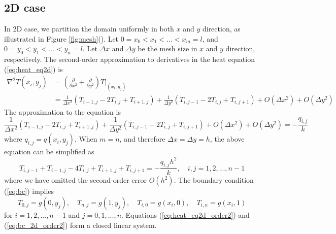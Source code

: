 \documentclass{article}
\begin{document}
\subsection{2D case}
In 2D case, we partition the domain uniformly in both $x$ and $y$ direction, as illustrated 
in Figure \ref{fig:mesh}(). Let $0 = x_0 < x_1 < ... < x_m = l$,
and $0 = y_0 < y_1 < ... < y_n = l$. Let $\Delta x$ and $\Delta y$ be the mesh size in $x$ and $y$ direction, respectively. The second-order approximation to derivatives in the heat equation (\ref{eq:heat_eq2d}) is
\begin{equation*}
\begin{split}
    \nabla^2 T(x_i, y_j) & = \left(\frac{\partial}{\partial x^2} + \frac{\partial}{\partial y^2}\right) T|_{(x_i,y_j)} \\
    & = \frac{1}{\Delta x^2}(T_{i-1,j} - 2T_{i,j} + T_{i+1,j}) + \frac{1}{\Delta y^2}(T_{i,j-1} -2T_{i,j} + T_{i,j+1})
    + O(\Delta x^2) + O(\Delta y^2)
\end{split}
\end{equation*}
The approximation to the equation is
\begin{equation*}
    \frac{1}{\Delta x^2}(T_{i-1,j} - 2T_{i,j} + T_{i+1,j}) + \frac{1}{\Delta y^2}(T_{i,j-1} -2T_{i,j} + T_{i,j+1}) + O(\Delta x^2) + O(\Delta y^2) = - \frac{q_{i,j}}{k}
\end{equation*}
where $q_{i,j} = q(x_i,y_j)$.
When $m = n$, and therefore $\Delta x = \Delta y = h$, the above equation can be simplified as
\begin{equation} \label{eq:heat_eq2d_order2}
    T_{i,j-1} + T_{i-1,j} - 4T_{i,j} + T_{i+1,j} + T_{i,j+1} = - \frac{q_{i,j} h^2}{k},
    \quad i, j = 1, 2, ..., n-1
\end{equation}
where we have omitted the second-order error $O(h^2)$. The boundary condition (\ref{eq:bc}) implies
\begin{equation} \label{eq:bc_2d_order2}
    T_{0,j} = g(0,y_j), \quad T_{n,j} = g(1,y_j), \quad T_{i,0} = g(x_i,0), \quad T_{i,n} = g(x_i, 1)
\end{equation}
for $i = 1, 2, ..., n-1$ and $j = 0, 1, ..., n$. Equations (\ref{eq:heat_eq2d_order2}) and (\ref{eq:bc_2d_order2}) form a closed linear system.
\end{document}
